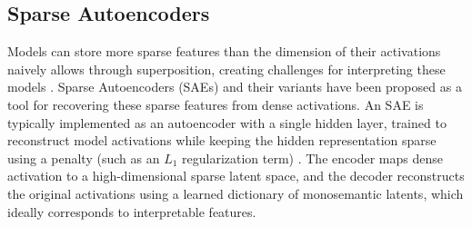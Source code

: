 \subsection*{Sparse Autoencoders} 
Models can store more sparse features than the dimension of their activations naively allows through superposition, creating challenges for interpreting these models \citep{elhage2022toy}. Sparse Autoencoders (SAEs) \citep{bricken2023monosemanticity, huben2024sparse} and their variants \citep{gao2024scaling, bussmann2024batchtopk, rajamanoharan2024jumping, leask2025inference, costa2025evaluating, bussmann2025learning} have been proposed as a tool for recovering these sparse features from dense activations. 
An SAE is typically implemented as an autoencoder with a single hidden layer, trained to reconstruct model activations while keeping the hidden representation sparse using a penalty (such as an $L_1$ regularization term) \citep{huben2024sparse,bricken2023monosemanticity}. 
The encoder maps dense activation to a high-dimensional sparse latent space, and the decoder reconstructs the original activations using a learned dictionary of monosemantic latents, which ideally corresponds to interpretable features.



